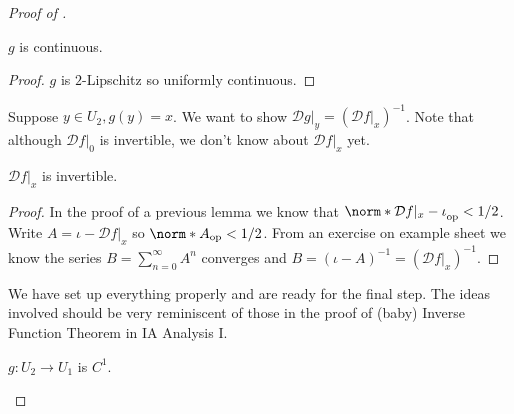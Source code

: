 \documentclass[a4paper]{article}
\newcommand*{\D}{\mathcal{D}}
\newcommand*{\nop}[1]{\norm*{#1}_{\text{op}}}
\theoremstyle{definition}
\begin{document}
\begin{proof}[Proof of ]
  \begin{corollary}
    \(g\) is continuous.
  \end{corollary}

  \begin{proof}
    \(g\) is \(2\)-Lipschitz so uniformly continuous.
  \end{proof}

  Suppose \(y \in U_2, g(y) = x\). We want to show \(\D g|_y = (\D f|_x)^{-1}\). Note that although \(\D f|_0\) is invertible, we don't know about \(\D f|_x\) yet.

  \begin{lemma}
    \(\D f|_x\) is invertible.
  \end{lemma}
  
  \begin{proof}
    In the proof of a previous lemma we know that \(\nop{\D f|_x - \iota} < 1/2\). Write \(A = \iota - \D f|_x\) so \(\nop A < 1/2\). From an exercise on example sheet we know the series \(B = \sum_{n = 0}^\infty A^n\) converges and \(B = (\iota - A)^{-1} = (\D f|_x)^{-1}\).
  \end{proof}

  We have set up everything properly and are ready for the final step. The ideas involved should be very reminiscent of those in the proof of (baby) Inverse Function Theorem in IA Analysis I.
  
  \begin{proposition}
    \(g: U_2 \to U_1\) is \(C^1\).
  \end{proposition}


\end{proof}
\end{document}
